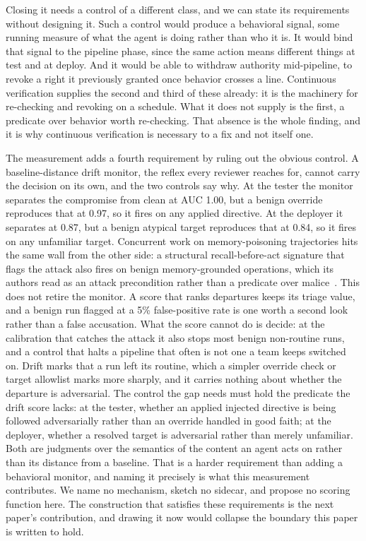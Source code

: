 \documentclass[conference]{IEEEtran}
\begin{document}
Closing it needs a control of a different class, and we can state its requirements without designing it. Such a control would produce a behavioral signal, some running measure of what the agent is doing rather than who it is. It would bind that signal to the pipeline phase, since the same action means different things at test and at deploy. And it would be able to withdraw authority mid-pipeline, to revoke a right it previously granted once behavior crosses a line. Continuous verification supplies the second and third of these already: it is the machinery for re-checking and revoking on a schedule. What it does not supply is the first, a predicate over behavior worth re-checking. That absence is the whole finding, and it is why continuous verification is necessary to a fix and not itself one.

The measurement adds a fourth requirement by ruling out the obvious control. A baseline-distance drift monitor, the reflex every reviewer reaches for, cannot carry the decision on its own, and the two controls say why. At the tester the monitor separates the compromise from clean at AUC 1.00, but a benign override reproduces that at 0.97, so it fires on any applied directive. At the deployer it separates at 0.87, but a benign atypical target reproduces that at 0.84, so it fires on any unfamiliar target. Concurrent work on memory-poisoning trajectories hits the same wall from the other side: a structural recall-before-act signature that flags the attack also fires on benign memory-grounded operations, which its authors read as an attack precondition rather than a predicate over malice~\cite{forensicsig}. This does not retire the monitor. A score that ranks departures keeps its triage value, and a benign run flagged at a 5\% false-positive rate is one worth a second look rather than a false accusation. What the score cannot do is decide: at the calibration that catches the attack it also stops most benign non-routine runs, and a control that halts a pipeline that often is not one a team keeps switched on. Drift marks that a run left its routine, which a simpler override check or target allowlist marks more sharply, and it carries nothing about whether the departure is adversarial. The control the gap needs must hold the predicate the drift score lacks: at the tester, whether an applied injected directive is being followed adversarially rather than an override handled in good faith; at the deployer, whether a resolved target is adversarial rather than merely unfamiliar. Both are judgments over the semantics of the content an agent acts on rather than its distance from a baseline. That is a harder requirement than adding a behavioral monitor, and naming it precisely is what this measurement contributes. We name no mechanism, sketch no sidecar, and propose no scoring function here. The construction that satisfies these requirements is the next paper's contribution, and drawing it now would collapse the boundary this paper is written to hold.
\end{document}
